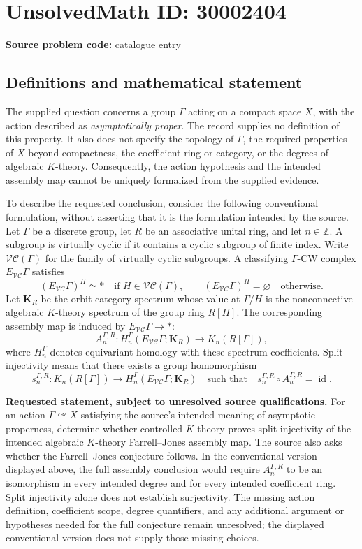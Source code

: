 \documentclass[11pt]{article}
\newcommand{\Z}{\mathbb{Z}}
\begin{document}
\section*{UnsolvedMath ID: 30002404}
\textbf{Source problem code:} catalogue entry
\subsection{Definitions and mathematical statement}
The supplied question concerns a group \(\Gamma\) acting on a compact space \(X\), with the action described as \emph{asymptotically proper}. The record supplies no definition of this property. It also does not specify the topology of \(\Gamma\), the required properties of \(X\) beyond compactness, the coefficient ring or category, or the degrees of algebraic \(K\)-theory. Consequently, the action hypothesis and the intended assembly map cannot be uniquely formalized from the supplied evidence.

To describe the requested conclusion, consider the following conventional formulation, without asserting that it is the formulation intended by the source. Let \(\Gamma\) be a discrete group, let \(R\) be an associative unital ring, and let \(n\in\Z\). A subgroup is virtually cyclic if it contains a cyclic subgroup of finite index. Write \(\mathcal{VC}(\Gamma)\) for the family of virtually cyclic subgroups. A classifying \(\Gamma\)-CW complex \(E_{\mathcal{VC}}\Gamma\) satisfies
\[
(E_{\mathcal{VC}}\Gamma)^H\simeq *\quad\text{if }H\in\mathcal{VC}(\Gamma),
\qquad
(E_{\mathcal{VC}}\Gamma)^H=\varnothing\quad\text{otherwise}.
\]
Let \(\mathbf K_R\) be the orbit-category spectrum whose value at \(\Gamma/H\) is the nonconnective algebraic \(K\)-theory spectrum of the group ring \(R[H]\). The corresponding assembly map is induced by \(E_{\mathcal{VC}}\Gamma\to *\):
\[
A_n^{\Gamma,R}\colon
H_n^\Gamma(E_{\mathcal{VC}}\Gamma;\mathbf K_R)
\longrightarrow K_n(R[\Gamma]),
\]
where \(H_n^\Gamma\) denotes equivariant homology with these spectrum coefficients. Split injectivity means that there exists a group homomorphism
\[
s_n^{\Gamma,R}\colon K_n(R[\Gamma])\longrightarrow
H_n^\Gamma(E_{\mathcal{VC}}\Gamma;\mathbf K_R)
\quad\text{such that}\quad
s_n^{\Gamma,R}\circ A_n^{\Gamma,R}=\operatorname{id}.
\]

\textbf{Requested statement, subject to unresolved source qualifications.} For an action \(\Gamma\curvearrowright X\) satisfying the source's intended meaning of asymptotic properness, determine whether controlled \(K\)-theory proves split injectivity of the intended algebraic \(K\)-theory Farrell--Jones assembly map. The source also asks whether the Farrell--Jones conjecture follows. In the conventional version displayed above, the full assembly conclusion would require \(A_n^{\Gamma,R}\) to be an isomorphism in every intended degree and for every intended coefficient ring. Split injectivity alone does not establish surjectivity. The missing action definition, coefficient scope, degree quantifiers, and any additional argument or hypotheses needed for the full conjecture remain unresolved; the displayed conventional version does not supply those missing choices.
\end{document}
